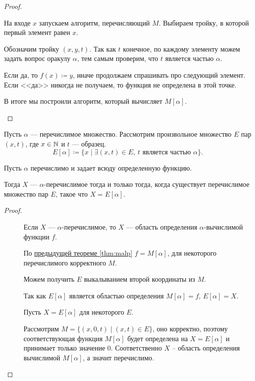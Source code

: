 \begin{proof}
\begin{description}
		   На входе $ x$ запускаем алгоритм, перечисляющий  $ M$. Выбираем тройку, в которой первый элемент равен $ x$. 

		   Обозначим тройку $ (x, y, t)$. Так как  $ t$ конечное, по каждому элементу можем задать вопрос оракулу  $  \alpha $, тем самым проверим, что $ t$ является частью $  \alpha $.

		   Если да, то $ f(x) \coloneqq y$, иначе продолжаем спрашивать про следующий элемент.
		   Если <<да>> никогда не получаем, то функция не определена в этой точке.

		   В итоге мы построили алгоритм, который вычисляет $ M[ \alpha ]$.
   \end{description} 
\end{proof}

\begin{defn}
	Пусть $  \alpha $ --- перечислимое множество. Рассмотрим произвольное множество $ E$ пар  $ (x, t)$, где  $ x \in \mathbb{N}$ и $ t$ --- образец.
	\[
		E[ \alpha ] \coloneqq \{x \mid \exists (x, t) \in E, ~ t \text{ является частью } \alpha \}
	.\] 
\end{defn}

\begin{thm}
	Пусть $\alpha$ перечислимо и задает всюду определенную функцию. 
	
	Тогда $ X$ --- $  \alpha $-перечислимое тогда и только тогда, когда существует перечислимое множество пар $ E$, такое что  $ X = E[ \alpha ]$.
\end{thm}
\begin{proof}
    ~\begin{description}
		\item[]
			Если $ X$ ---  $  \alpha $-перечислимое, то $ X$ --- область определения  $  \alpha $-вычислимой функции $ f$. 
			
			По \hyperref[thm:malp]{предыдущей теореме \ref{thm:malp}} $ f = M[ \alpha ]$, для некоторого перечислимого корректного $ M$.

			Можем получить  $ E$ выкалыванием второй координаты из $ M$.

			Так как $ E[ \alpha ]$ является областью определения $ M[ \alpha ] = f$, $ E[ \alpha ] = X$.
        \item[]
			Пусть $ X = E[ \alpha ]$ для некоторого $ E$.

			Рассмотрим  $ M = \{(x, 0, t) \mid (x, t) \in  E\}$, оно корректно, поэтому соответствующая функция $ M[ \alpha ]$ будет определена на $ X = E[ \alpha ]$ и принимает только значение $ 0$. Соответственно $X$ -- область определения вычислимой $M[\alpha]$, а значит перечислимо.
    \end{description} 
\end{proof}

